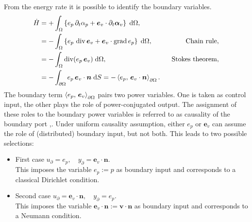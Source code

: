 From the energy rate it is possible to identify the boundary variables. 
\begin{align*}
\dot{H} &= +\int_{\Omega} \left\{ e_p \, \partial_t \alpha_p + \bm{e}_v \cdot \partial_t \bm{\alpha}_v\right\} \d\Omega, \\
 &= -\int_{\Omega} \left\{e_p \, \div \bm{e}_v + \bm{e}_v \cdot \grad e_p \right\}\d\Omega, \qquad &\text{Chain rule}, \\
 &= -\int_{\Omega} \div(e_p \, \bm{e}_v) \d\Omega, \qquad &\text{Stokes theorem}, \\
 &= -\int_{\partial \Omega} e_p \, \bm{e}_v\cdot\bm{n} \d{S} = -\inner[\partial\Omega]{e_p}{\bm{e}_v \cdot\bm{n}}.
\end{align*}
The boundary term $\inner[\partial\Omega]{e_p}{\bm{e}_v}$ pairs two power variables. One is taken as control input, the other plays the role of power-conjugated output. The assignment of these roles to the boundary power variables is referred to as causality of the boundary port \cite{kotyczka2018weak},\cite[Chapter~2]{kotyczka2019numerical}. Under uniform causality assumption, either $e_p$ or $\bm{e}_v$ can assume the role of (distributed) boundary input, but not both. This leads to two possible selections:
\begin{itemize}
	\item {First case} ${u}_\partial = e_p, \quad {y}_\partial = \bm{e}_v \cdot\bm{n}$. \\
	This imposes the variable $e_p:= p$ as boundary input and corresponds to a classical Dirichlet condition.
	
	\item {Second case} ${u}_\partial = \bm{e}_v \cdot\bm{n}, \quad {y}_\partial = e_p$. \\
	This imposes the variable $\bm{e}_v \cdot\bm{n}:= \bm{v}\cdot \bm{n}$ as boundary input and corresponds to a Neumann condition.
\end{itemize} 

